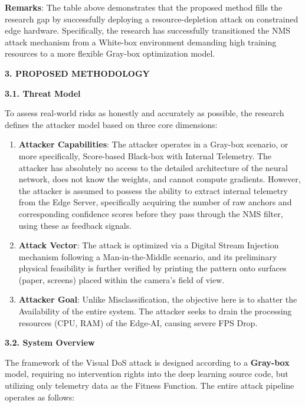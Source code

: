 \documentclass[]{article}
\begin{document}
\textbf{Remarks}: The table above demonstrates that the proposed method fills the research gap by successfully deploying a resource-depletion attack on constrained edge hardware. Specifically, the research has successfully transitioned the NMS attack mechanism from a White-box environment demanding high training resources to a more flexible Gray-box optimization model.\textbf{\hfill\break
}

\textbf{3. PROPOSED METHODOLOGY}

\textbf{3.1. Threat Model}

To assess real-world risks as honestly and accurately as possible, the research defines the attacker model based on three core dimensions:

\begin{enumerate}
\def\labelenumi{\arabic{enumi}.}
\item
  \textbf{Attacker Capabilities}: The attacker operates in a Gray-box scenario, or more specifically, Score-based Black-box with Internal Telemetry. The attacker has absolutely no access to the detailed architecture of the neural network, does not know the weights, and cannot compute gradients. However, the attacker is assumed to possess the ability to extract internal telemetry from the Edge Server, specifically acquiring the number of raw anchors and corresponding confidence scores before they pass through the NMS filter, using these as feedback signals.
\item
  \textbf{Attack Vector}: The attack is optimized via a Digital Stream Injection mechanism following a Man-in-the-Middle scenario, and its preliminary physical feasibility is further verified by printing the pattern onto surfaces (paper, screens) placed within the camera's field of view.
\item
  \textbf{Attacker Goal}: Unlike Misclassification, the objective here is to shatter the Availability of the entire system. The attacker seeks to drain the processing resources (CPU, RAM) of the Edge-AI, causing severe FPS Drop.
\end{enumerate}

\textbf{3.2. System Overview}

The framework of the Visual DoS attack is designed according to a \textbf{Gray-box} model, requiring no intervention rights into the deep learning source code, but utilizing only telemetry data as the Fitness Function. The entire attack pipeline operates as follows:
\end{document}

